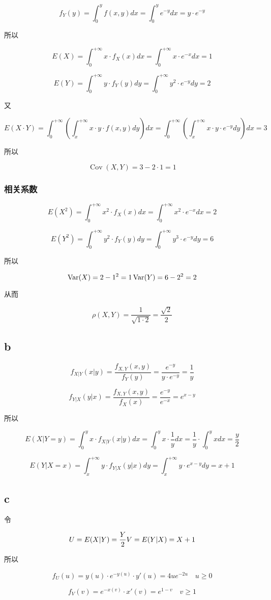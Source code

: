 \documentclass[]{article}
\begin{document}
\[f_{Y}(y)=\int_{0}^{y} f(x, y) d x=\int_{0}^{y} e^{-y} d x=y \cdot e^{-y}\]

所以

\[E(X)=\int_{0}^{+\infty} x \cdot f_{X}(x) d x=\int_{0}^{+\infty} x \cdot e^{-x} d x=1\]

\[E(Y)=\int_{0}^{+\infty} y \cdot f_{Y}(y) d y=\int_{0}^{+\infty} y^{2} \cdot e^{-y} d y=2\]

又

\[E(X \cdot Y)=\int_{0}^{+\infty}\left(\int_{x}^{+\infty} x \cdot y \cdot f(x, y) d y\right) d x=\int_{0}^{+\infty}\left(\int_{x}^{+\infty} x \cdot y \cdot e^{-y} d y\right) d x=3\]

所以

\[\operatorname{Cov}(X, Y)=3-2 \cdot 1=1\]

\subsubsection{相关系数}\label{header-n64}

\[E\left(X^{2}\right)=\int_{0}^{+\infty} x^{2} \cdot f_{X}(x) d x=\int_{0}^{+\infty} x^{2} \cdot e^{-x} d x=2\]

\[E\left(Y^{2}\right)=\int_{0}^{+\infty} y^{2} \cdot f_{Y}(y) d y=\int_{0}^{+\infty} y^{3} \cdot e^{-y} d y=6\]

所以

\[\operatorname{Var}(X)=2-1^{2}=1\\

\operatorname{Var}(Y)=6-2^{2}=2\]

从而

\[\rho(X, Y)=\frac{1}{\sqrt{1 \cdot 2}}=\frac{\sqrt 2}{2}\]

\subsection{b}\label{header-n79}

\[f_{X | Y}(x | y)=\frac{f_{X, Y}(x, y)}{f_{Y}(y)}=\frac{e^{-y}}{y \cdot e^{-y}}=\frac{1}{y}\]

\[f_{Y | X}(y | x)=\frac{f_{X, Y}(x, y)}{f_{X}(x)}=\frac{e^{-y}}{e^{-x}}=e^{x-y}\]

所以

\[E(X | Y=y)=\int_{0}^{y} x \cdot f_{X | Y}(x | y) d x=\int_{0}^{y} x \cdot \frac{1}{y} d x=\frac{1}{y} \cdot \int_{0}^{y} x d x=\frac{y}{2}\]

\[E(Y | X=x)=\int_{x}^{+\infty} y \cdot f_{Y | X}(y | x) d y=\int_{x}^{+\infty} y \cdot e^{x-y} d y=x+1\]

\subsection{c}\label{header-n92}

令

\[U=E(X|Y)=\frac{Y}{2}\\

V=E(Y|X)=X+1\]

所以

\[f_U(u)=y(u) \cdot e^{-y(u)} \cdot y'(u)=4 ue^{-2 u} \quad u\ge0\]

\[f_V(v)=e^{-x(v)} \cdot x'(v)=e^{1-v}\quad v\ge1\]
\end{document}
